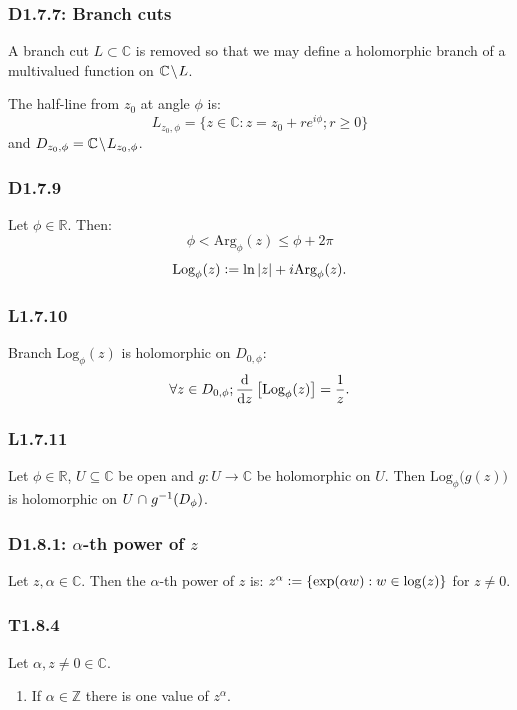\documentclass{article}
\newcommand{\deq}{\vcentcolon=}
\begin{document}
\begin{multicols*}{3}
\subsubsection*{D1.7.7: Branch cuts}
A branch cut $L\subset\mathbb{C}$ is removed
so that we may define
a holomorphic branch of a multivalued function
on $\mathbb{C}\hspace{0.01in}\backslash\hspace{0.01in}L$.

The half-line from $z_0$ at angle $\phi$ is:
$$L_{z_0,\phi}=\{z\in\mathbb{C}:z=z_0+re^{i\phi};r\geq0\}$$
and $D_{z_0,\phi}=\mathbb{C}
\hspace{0.01in}\backslash\hspace{0.01in}L_{z_0,\phi}$.

\subsubsection*{D1.7.9}
Let $\phi\in\mathbb{R}$. Then:
$$\phi<\text{Arg}_{\phi}(z)\leq\phi+2\pi$$
$$\text{Log}_{\phi}(z)\deq\ln|z|+i\text{Arg}_{\phi}(z).$$

\subsubsection*{L1.7.10}
Branch $\text{Log}_{\phi}(z)$
is holomorphic on $D_{0,\phi}$: 
$$\forall z\in D_{0,\phi};
\dv{z}\left[\text{Log}_{\phi}(z)\right]=\frac{1}{z}.$$

\subsubsection*{L1.7.11}
Let $\phi\in\mathbb{R}$, $U\subseteq\mathbb{C}$ be open
and $g:U\rightarrow\mathbb{C}$ be holomorphic on $U$.
Then $\text{Log}_{\phi}\bigl(g(z)\bigr)$ is holomorphic
on $U\hspace{0.01in}\cap\hspace{0.01in}g^{-1}(D_{\phi})$.

\subsubsection*{D1.8.1: $\alpha$-th power of $z$}
Let $z,\alpha\in\mathbb{C}$. Then the $\alpha$-th power of $z$ is:
$z^{\alpha}\deq\{\exp(\alpha w):w\in\log(z)\}$ for $z\neq0$.

\subsubsection*{T1.8.4}
Let $\alpha,z\neq0\in\mathbb{C}$.
\begin{enumerate}
    \item If $\alpha\in\mathbb{Z}$ there is
    one value of $z^{\alpha}$.


\end{enumerate}
\end{multicols*}
\end{document}

